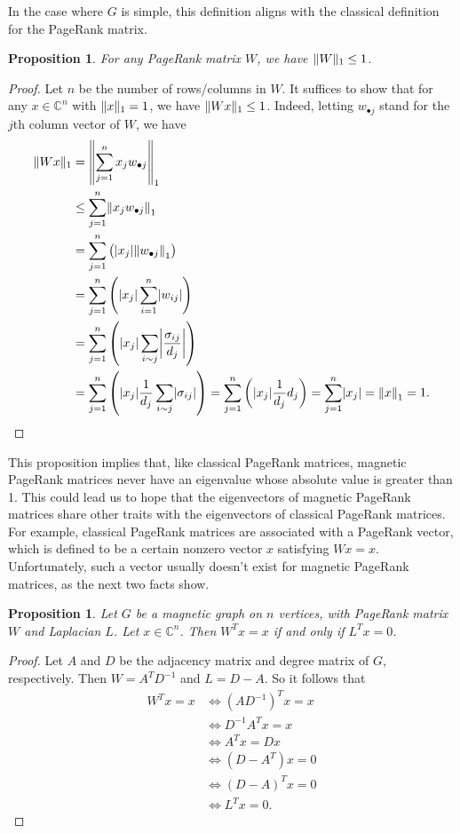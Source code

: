 \documentclass[12pt]{article}
\newtheorem{prop}[thm]{Proposition}
\theoremstyle{definition}
\newcommand{\C}{\mathbb C}
\DeclarePairedDelimiter\abs{\lvert}{\rvert}
\DeclarePairedDelimiter\norm{\lVert}{\rVert}
\begin{document}
In the case where $G$ is simple, this definition aligns with the classical definition for the PageRank matrix.

\begin{prop}\label{operator norm of PageRank matrix leq 1}
For any PageRank matrix $W$, we have $\norm{W}_1 \leq 1$.
\end{prop}
\begin{proof}
Let $n$ be the number of rows/columns in $W$. It suffices to show that for any $x \in \C^n$ with $\norm{x}_1 = 1$, we have $\norm{W x}_1 \leq 1$. Indeed, letting $w_{\bullet j}$ stand for the $j$th column vector of $W$, we have
\begin{align*}
\norm{W x}_1 &= \norm*{\sum_{j=1}^n x_j w_{\bullet j}}_1 \\
&\leq \sum_{j=1}^n \norm*{x_j w_{\bullet j}}_1 \\
&= \sum_{j=1}^n \left( \abs*{x_j} \norm*{w_{\bullet j}}_1 \right) \\
&= \sum_{j=1}^n \left( \abs*{x_j} \sum_{i=1}^n \abs*{w_{i j}} \right) \\
&= \sum_{j=1}^n \left( \abs*{x_j} \sum_{i \sim j} \abs*{\frac{\sigma_{ij}}{d_j}} \right) \\
&= \sum_{j=1}^n \left( \abs*{x_j} \frac{1}{d_j} \sum_{i \sim j} \abs*{\sigma_{ij}} \right) 
= \sum_{j=1}^n \left( \abs*{x_j} \frac{1}{d_j} d_j \right) 
= \sum_{j=1}^n \abs*{x_j} 
= \norm*{x}_1 
= 1.
\end{align*}
\end{proof}

This proposition implies that, like classical PageRank matrices, magnetic PageRank matrices never have an eigenvalue whose absolute value is greater than 1. This could lead us to hope that the eigenvectors of magnetic PageRank matrices share other traits with the eigenvectors of classical PageRank matrices. For example, classical PageRank matrices are associated with a PageRank vector, which is defined to be a certain nonzero vector $x$ satisfying $W x = x$. Unfortunately, such a vector usually doesn't exist for magnetic PageRank matrices, as the next two facts show.

\begin{prop}\label{Laplacian Eigenvectors vs PageRank Eigenvectors}
Let $G$ be a magnetic graph on $n$ vertices, with PageRank matrix $W$ and Laplacian $L$. Let $x \in \C^n$. Then $W^T x = x$ if and only if $L^T x = 0$.
\end{prop}
\begin{proof}
Let $A$ and $D$ be the adjacency matrix and degree matrix of $G$, respectively.  Then $W = A^T D^{-1}$ and $L = D - A$. So it follows that
\begin{align*}
W^T x = x &\iff (A D^{-1})^T x = x \\
&\iff D^{-1} A^T x = x \\
&\iff A^T x = D x \\
&\iff (D - A^T) x = 0 \\
&\iff (D - A)^T x = 0 \\
&\iff L^T x = 0.
\end{align*}
\end{proof}
\end{document}
